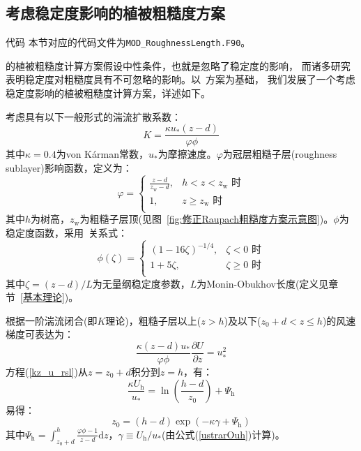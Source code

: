 \subsection{考虑稳定度影响的植被粗糙度方案}\label{考虑稳定度粗糙度方案}
\begin{mymdframed}{代码}
  本节对应的代码文件为\texttt{MOD\_RoughnessLength.F90}。
\end{mymdframed}

\citet{raupach1992drag,raupach1994simplified}的植被粗糙度计算方案假设中性条件，也就是忽略了稳定度的影响，
而诸多研究表明稳定度对粗糙度具有不可忽略的影响。以~\citet{raupach1992drag,raupach1994simplified}方案为基础，
我们发展了一个考虑稳定度影响的植被粗糙度计算方案，详述如下。

考虑具有以下一般形式的湍流扩散系数：
\begin{equation}\label{eddydiffusivity}
  K=\frac{\kappa u_{*} (z-d)} {\varphi \phi }
\end{equation}
其中$\kappa=0.4$为von K\'arman常数，$u_{*}$为摩擦速度。$\varphi$为冠层粗糙子层(roughness sublayer)影响函数，定义为：
\begin{equation}
  \varphi = \begin{cases}
    \frac{z-d} {z_{\mathrm{w}}-d}, & h<z<z_{\mathrm{w}} \text { 时} \\
    1, & z \geqslant z_{\mathrm{w}} \text { 时} \\
  \end{cases}
\end{equation}
其中$h$为树高，$z_{\mathrm{w}}$为粗糙子层顶(见图~\ref{fig:修正Raupach粗糙度方案示意图})。$\phi$为稳定度函数，采用~\citet{dyer1974review}关系式：
\begin{equation}
  \phi(\zeta) = \begin{cases}
    (1-16\zeta)^{-1/4}, & \zeta<0 \text { 时} \\
    1+5\zeta, & \zeta \geqslant 0 \text { 时} \\
  \end{cases}
\end{equation}
其中$\zeta = (z-d)/L$为无量纲稳定度参数，$L$为Monin-Obukhov长度(定义见章节~\ref{基本理论})。

根据一阶湍流闭合(即$K$理论)，粗糙子层以上($z>h$)及以下($z_0 + d<z \leqslant h$)的风速梯度可表达为：
\begin{equation}\label{kz_u_rsl}
  \frac{\kappa (z-d) u_{*}}{\varphi \phi} \frac{\partial U}{\partial z}=u_{*}^2
\end{equation}
方程(\ref{kz_u_rsl})从$z=z_0+d$积分到$z=h$，有：
\begin{equation}\label{u_rsl_htop}
  \frac{\kappa U_{\mathrm{h}}}{u_{*}} = \ln \left(\frac{h-d}{z_{0}}\right) + \Psi_{\mathrm{h}}
\end{equation}
易得：
\begin{equation}\label{z0_rsl}
  z_{0} = (h-d)\exp (-\kappa \gamma + \Psi_{\mathrm{h}})
\end{equation}
其中$\Psi_{\mathrm{h}}=\int_{z_{0}+d}^{h} \frac{\varphi \phi - 1}{z-d} {\mathrm d} z$，$\gamma \equiv U_{\mathrm{h}}/u_{*}$(由公式(\ref{ustrarOuh})计算)。

